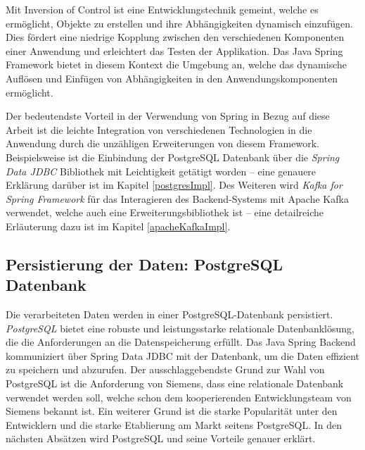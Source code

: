 Mit Inversion of Control ist eine Entwicklungstechnik gemeint, welche es ermöglicht, Objekte zu erstellen und ihre Abhängigkeiten dynamisch einzufügen. Dies fördert eine niedrige Kopplung zwischen den verschiedenen Komponenten einer Anwendung und erleichtert das Testen der Applikation. Das Java Spring Framework bietet in diesem Kontext die Umgebung an, welche das dynamische Auflösen und Einfügen von Abhängigkeiten in den Anwendungskomponenten ermöglicht. \cite{springDocs}

Der bedeutendste Vorteil in der Verwendung von Spring in Bezug auf diese Arbeit ist die leichte Integration von verschiedenen Technologien in die Anwendung durch die unzähligen Erweiterungen von diesem Framework. Beispielsweise ist die Einbindung der PostgreSQL Datenbank über die \emph{Spring Data JDBC} Bibliothek mit Leichtigkeit getätigt worden -- eine genauere Erklärung darüber ist im Kapitel \ref{postgresImpl}. Des Weiteren wird \emph{Kafka for Spring Framework} für das Interagieren des Backend-Systems mit Apache Kafka verwendet, welche auch eine Erweiterungsbibliothek ist -- eine detailreiche Erläuterung dazu ist im Kapitel \ref{apacheKafkaImpl}.

\subsection{Persistierung der Daten: PostgreSQL Datenbank}

Die verarbeiteten Daten werden in einer PostgreSQL-Datenbank persistiert. \emph{PostgreSQL} bietet eine robuste und leistungsstarke relationale Datenbanklösung, die die Anforderungen an die Datenspeicherung erfüllt. Das Java Spring Backend kommuniziert über Spring Data JDBC mit der Datenbank, um die Daten effizient zu speichern und abzurufen. Der ausschlaggebendste Grund zur Wahl von PostgreSQL ist die Anforderung von Siemens, dass eine relationale Datenbank verwendet werden soll, welche schon dem kooperierenden Entwicklungsteam von Siemens bekannt ist. Ein weiterer Grund ist die starke Popularität unter den Entwicklern und die starke Etablierung am Markt seitens PostgreSQL. In den nächsten Absätzen wird PostgreSQL und seine Vorteile genauer erklärt. 

